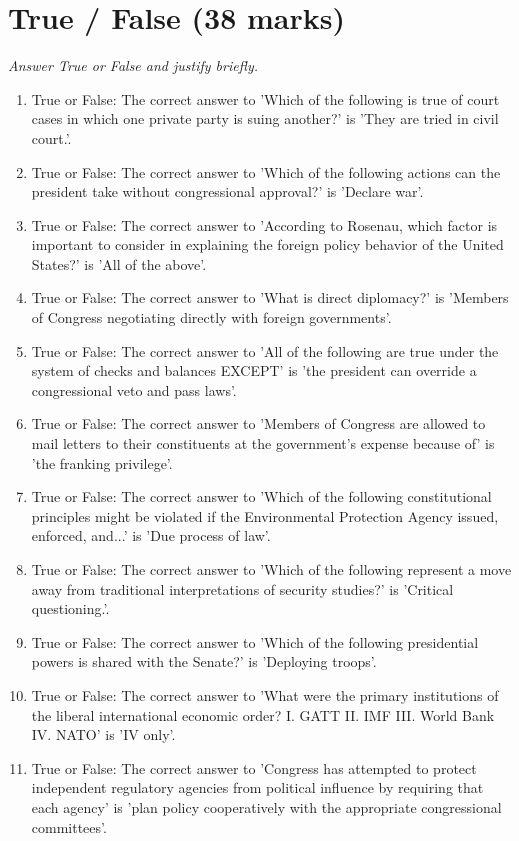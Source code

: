 \documentclass[12pt]{article}
\begin{document}
\section*{True / False (38 marks)}
\textit{Answer True or False and justify briefly.}
\begin{enumerate}[label=\arabic*.]
\item True or False: The correct answer to 'Which of the following is true of court cases in which one private party is suing another?' is 'They are tried in civil court.'.
\item True or False: The correct answer to 'Which of the following actions can the president take without congressional approval?' is 'Declare war'.
\item True or False: The correct answer to 'According to Rosenau, which factor is important to consider in explaining the foreign policy behavior of the United States?' is 'All of the above'.
\item True or False: The correct answer to 'What is direct diplomacy?' is 'Members of Congress negotiating directly with foreign governments'.
\item True or False: The correct answer to 'All of the following are true under the system of checks and balances EXCEPT' is 'the president can override a congressional veto and pass laws'.
\item True or False: The correct answer to 'Members of Congress are allowed to mail letters to their constituents at the government's expense because of' is 'the franking privilege'.
\item True or False: The correct answer to 'Which of the following constitutional principles might be violated if the Environmental Protection Agency issued, enforced, and...' is 'Due process of law'.
\item True or False: The correct answer to 'Which of the following represent a move away from traditional interpretations of security studies?' is 'Critical questioning.'.
\item True or False: The correct answer to 'Which of the following presidential powers is shared with the Senate?' is 'Deploying troops'.
\item True or False: The correct answer to 'What were the primary institutions of the liberal international economic order? I. GATT II. IMF III. World Bank IV. NATO' is 'IV only'.
\item True or False: The correct answer to 'Congress has attempted to protect independent regulatory agencies from political influence by requiring that each agency' is 'plan policy cooperatively with the appropriate congressional committees'.

\end{enumerate}
\end{document}
